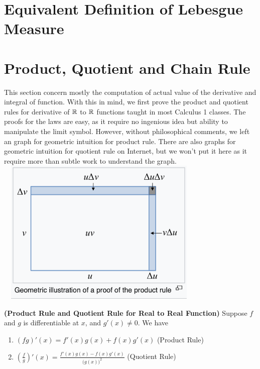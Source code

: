 \documentclass{report}
\begin{document}
\section{Equivalent Definition of Lebesgue Measure}
\begin{abstract}

\end{abstract}
\section{Product, Quotient and Chain Rule}
\begin{mdframed}
This section concern mostly the computation of actual value of the derivative and integral of function. With this in mind, we first prove the product and quotient rules for derivative of $\mathbb{R}$ to  $\mathbb{R}$ functions taught in most Calculus 1 classes. The proofs for the laws are easy, as it require no ingenious idea but ability to manipulate the limit symbol. However, without philosophical comments, we left an graph for geometric intuition for product rule. There are also graphs for geometric intuition for quotient rule on Internet, but we won't put it here as it require more than subtle work to understand the graph.    
\includegraphics[height=7cm,width=10cm]{product rule.png}
\end{mdframed}
\label{11}
\begin{theorem}
\textbf{(Product Rule and Quotient Rule for Real to Real Function)} Suppose $f$ and $g$ is differentiable at  $x$, and $g'(x)\neq 0$. We have 
\label{3}
\begin{enumerate}[label=(\alph*)]
  \item $(fg)'(x)=f'(x)g(x)+f(x)g'(x)$ (Product Rule)
  \item $(\frac{f}{g})'(x)=\frac{f'(x)g(x)-f(x)g'(x)}{\big(g(x) \big)^2}$ (Quotient Rule)
\end{enumerate}
\end{theorem}
\end{document}
